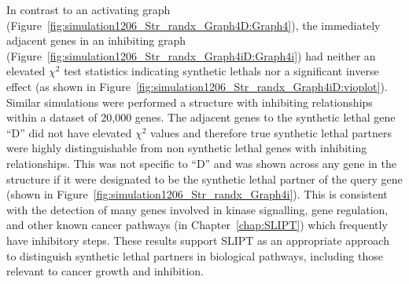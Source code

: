 In contrast to an activating graph (Figure~\ref{fig:simulation1206_Str_randx_Graph4D:Graph4}), the immediately adjacent genes  in an inhibiting graph (Figure~\ref{fig:simulation1206_Str_randx_Graph4iD:Graph4i}) had neither an elevated $\chi^2$ test statistics indicating \glspl{synthetic lethal} nor a significant inverse effect (as shown in Figure~\ref{fig:simulation1206_Str_randx_Graph4iD:vioplot}). Similar simulations were performed a  structure with inhibiting relationships within a dataset of 20,000 genes. The adjacent genes to the \gls{synthetic lethal} gene ``D'' did not have elevated $\chi^2$ values and therefore true \gls{synthetic lethal} partners were highly distinguishable from non synthetic lethal genes with inhibiting relationships. This was not specific to ``D'' and was shown across any gene in the  structure if it were designated to be the \gls{synthetic lethal} partner of the query gene (shown in Figure~\ref{fig:simulation1206_Str_randx_Graph4i}). This is consistent with the detection of many genes involved in kinase signalling, gene regulation, and other known cancer pathways (in Chapter~\ref{chap:SLIPT}) which frequently have inhibitory steps. These results support \gls{SLIPT} as an appropriate approach to distinguish \gls{synthetic lethal} partners in biological pathways, including those relevant to cancer growth and inhibition.


\iffalse
\begin{figure*}[!ht]
     \begin{center}
       \subcaptionbox{Graph Structure}{%
           \raisebox{0.15\textwidth}{
           \label{fig:simulation1206_Str_randx_Graph4iD:Graph4i}
           \texttt{[image: \{"/home/tomkelly/Documents/PhD Otago Uni/SL\_Model/Graph4iD".pdf]}}
           }
        }%
       \subcaptionbox{$\chi^2$ distribution for each gene}{%
           \label{fig:simulation1206_Str_randx_Graph4iD:vioplot}
           \texttt{[image: \{"/home/tomkelly/Documents/PhD Otago Uni/SL\_Model//RUN\_20161206\_Str\_randx/SL\_Model\_Test\_Graph\_1K\_Graph4i\_ROC\_samples\_SLstry\_vioplot(4)".pdf]}}
        }%
       \end{center}
      \caption[Detection of Synthetic Lethality within an Inhibiting Graph Structure]{\small \textbf{Detection of Synthetic Lethality within an Inhibiting  Graph Structure.} The gene ``D'' was designated to be \gls{synthetic lethal} and the $\chi^2$ value from \gls{SLIPT} was computed for each gene across the \glslink{graph}{graph} structure. The $\chi^2$ values were computed in 100 simulations of datasets of 20,000 genes including the \glslink{graph}{graph} structure and 1000 samples.}
\end{figure*}
\fi

